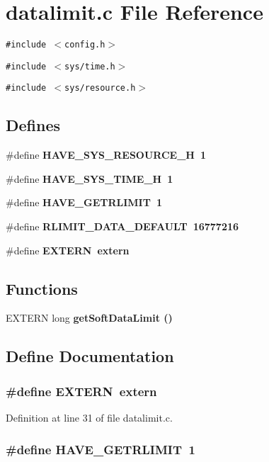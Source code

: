 \section{datalimit.c File Reference}
\label{datalimit_8c}
{\tt \#include $<$config.h$>$}\par
{\tt \#include $<$sys/time.h$>$}\par
{\tt \#include $<$sys/resource.h$>$}\par
\subsection*{Defines}
\begin{CompactItemize}
\item 
\#define \bf{HAVE\_\-SYS\_\-RESOURCE\_\-H}~1
\item 
\#define \bf{HAVE\_\-SYS\_\-TIME\_\-H}~1
\item 
\#define \bf{HAVE\_\-GETRLIMIT}~1
\item 
\#define \bf{RLIMIT\_\-DATA\_\-DEFAULT}~16777216
\item 
\#define \bf{EXTERN}~extern
\end{CompactItemize}
\subsection*{Functions}
\begin{CompactItemize}
\item 
EXTERN long \bf{get\-Soft\-Data\-Limit} ()
\end{CompactItemize}


\subsection{Define Documentation}
\subsubsection{\setlength{\rightskip}{0pt plus 5cm}\#define EXTERN~extern}\label{datalimit_8c_77366c1bd428629dc898e188bfd182a3}




Definition at line 31 of file datalimit.c.
\subsubsection{\setlength{\rightskip}{0pt plus 5cm}\#define HAVE\_\-GETRLIMIT~1}\label{datalimit_8c_30a57d379e02246aa63b4d32e683ec53}




